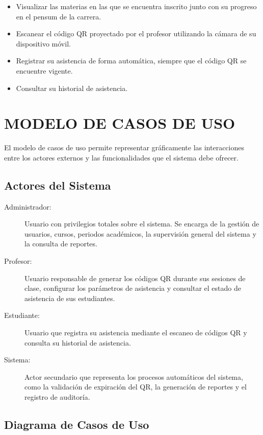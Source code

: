 \documentclass[12pt, letterpaper, oneside]{report}
\begin{document}
\begin{itemize}
  \item Visualizar las materias en las que se encuentra inscrito junto con su progreso en el pensum de la carrera.
  \item Escanear el c\'odigo QR proyectado por el profesor utilizando la c\'amara de su dispositivo m\'ovil.
  \item Registrar su asistencia de forma autom\'atica, siempre que el c\'odigo QR se encuentre vigente.
  \item Consultar su historial de asistencia.
\end{itemize}

\newpage

\chapter{MODELO DE CASOS DE USO}

El modelo de casos de uso permite representar gr\'aficamente las interacciones entre los actores externos y las funcionalidades que el sistema debe ofrecer.

\section{Actores del Sistema}

\begin{description}
  \item[Administrador:] Usuario con privilegios totales sobre el sistema. Se encarga de la gesti\'on de usuarios, cursos, periodos acad\'emicos, la supervisi\'on general del sistema y la consulta de reportes.
  \item[Profesor:] Usuario responsable de generar los c\'odigos QR durante sus sesiones de clase, configurar los par\'ametros de asistencia y consultar el estado de asistencia de sus estudiantes.
  \item[Estudiante:] Usuario que registra su asistencia mediante el escaneo de c\'odigos QR y consulta su historial de asistencia.
  \item[Sistema:] Actor secundario que representa los procesos autom\'aticos del sistema, como la validaci\'on de expiraci\'on del QR, la generaci\'on de reportes y el registro de auditor\'ia.
\end{description}

\section{Diagrama de Casos de Uso}
\end{document}
